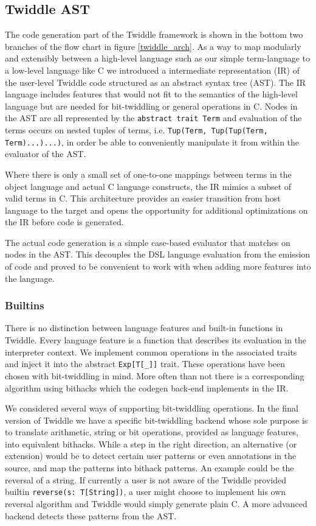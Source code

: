 \documentclass{article}
\begin{document}
\subsection{Twiddle AST}
The code generation part of the Twiddle framework is shown in the bottom two branches of the flow chart in figure \ref{twiddle_arch}. As a way to map modularly and extensibly between a high-level language such as our simple term-language to a low-level language like C we introduced a intermediate representation (IR) of the user-level Twiddle code structured as an abstract syntax tree (AST). The IR language includes features that would not fit to the semantics of the high-level language but are needed for bit-twiddling or general operations in C. Nodes in the AST are all represented by the \texttt{abstract trait Term} and evaluation of the terms occurs on nested tuples of terms, i.e. \texttt{Tup(Term, Tup(Tup(Term, Term)...)...)}, in order be able to conveniently manipulate it from within the evaluator of the AST.

Where there is only a small set of one-to-one mappings between terms in the object language and actual C language constructs, the IR mimics a subset of valid terms in C. This architecture provides an easier transition from host language to the target and opens the opportunity for additional optimizations on the IR before code is generated.

The actual code generation is a simple case-based evaluator that matches on nodes in the AST. This decouples the DSL language evaluation from the emission of code and proved to be convenient to work with when adding more features into the language.

\subsubsection{Builtins}
There is no distinction between language features and built-in functions in Twiddle. Every language feature is a function that describes its evaluation in the interpreter context. We implement common operations in the associated traits and inject it into the abstract \texttt{Exp[T[\_]]} trait. These operations have been chosen with bit-twiddling in mind. More often than not there is a corresponding algorithm using bithacks \cite{anderson2005bit} which the codegen back-end implements in the IR.

We considered several ways of supporting bit-twiddling operations. In the final version of Twiddle we have a specific bit-twiddling backend whose sole purpose is to translate arithmetic, string or bit operations, provided as language features, into equivalent bithacks. While a step in the right direction, an alternative (or extension) would be to detect certain user patterns or even annotations in the source, and map the patterns into bithack patterns. An example could be the reversal of a string. If currently a user is not aware of the Twiddle provided builtin \texttt{reverse(s: T[String])}, a user might choose to implement his own reversal algorithm and Twiddle would simply generate plain C. A more advanced backend detects these patterns from the AST.
\end{document}
